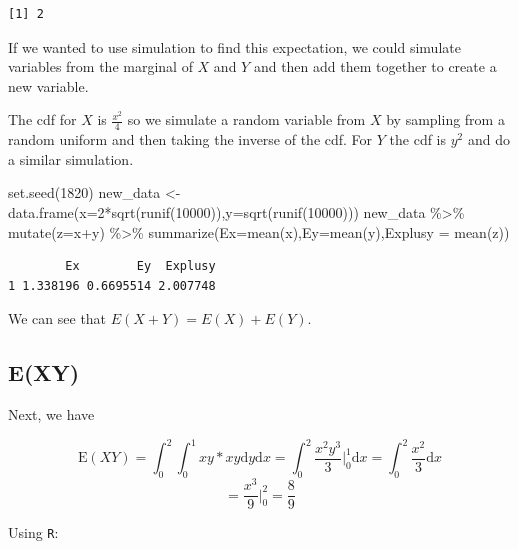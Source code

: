 \documentclass[
  letterpaper,
  DIV=11,
  numbers=noendperiod]{scrreprt}
\newenvironment{Shaded}{\begin{snugshade}}{\end{snugshade}}
\newcommand{\AttributeTok}[1]{\textcolor[rgb]{0.40,0.45,0.13}{#1}}
\newcommand{\DecValTok}[1]{\textcolor[rgb]{0.68,0.00,0.00}{#1}}
\newcommand{\FunctionTok}[1]{\textcolor[rgb]{0.28,0.35,0.67}{#1}}
\newcommand{\NormalTok}[1]{\textcolor[rgb]{0.00,0.23,0.31}{#1}}
\newcommand{\OtherTok}[1]{\textcolor[rgb]{0.00,0.23,0.31}{#1}}
\newcommand{\SpecialCharTok}[1]{\textcolor[rgb]{0.37,0.37,0.37}{#1}}
\begin{document}
\begin{verbatim}
[1] 2
\end{verbatim}

If we wanted to use simulation to find this expectation, we could
simulate variables from the marginal of \(X\) and \(Y\) and then add
them together to create a new variable.

The cdf for \(X\) is \(\frac{x^2}{4}\) so we simulate a random variable
from \(X\) by sampling from a random uniform and then taking the inverse
of the cdf. For \(Y\) the cdf is \(y^2\) and do a similar simulation.

\begin{Shaded}
\begin{Highlighting}[]
\FunctionTok{set.seed}\NormalTok{(}\DecValTok{1820}\NormalTok{)}
\NormalTok{new\_data }\OtherTok{\textless{}{-}} \FunctionTok{data.frame}\NormalTok{(}\AttributeTok{x=}\DecValTok{2}\SpecialCharTok{*}\FunctionTok{sqrt}\NormalTok{(}\FunctionTok{runif}\NormalTok{(}\DecValTok{10000}\NormalTok{)),}\AttributeTok{y=}\FunctionTok{sqrt}\NormalTok{(}\FunctionTok{runif}\NormalTok{(}\DecValTok{10000}\NormalTok{)))}
\NormalTok{new\_data }\SpecialCharTok{\%\textgreater{}\%}
  \FunctionTok{mutate}\NormalTok{(}\AttributeTok{z=}\NormalTok{x}\SpecialCharTok{+}\NormalTok{y) }\SpecialCharTok{\%\textgreater{}\%}
  \FunctionTok{summarize}\NormalTok{(}\AttributeTok{Ex=}\FunctionTok{mean}\NormalTok{(x),}\AttributeTok{Ey=}\FunctionTok{mean}\NormalTok{(y),}\AttributeTok{Explusy =} \FunctionTok{mean}\NormalTok{(z))}
\end{Highlighting}
\end{Shaded}

\begin{verbatim}
        Ex        Ey  Explusy
1 1.338196 0.6695514 2.007748
\end{verbatim}

We can see that \(E(X + Y) = E(X) + E(Y)\).

\subsection{E(XY)}\label{exy-3}

Next, we have

\[
\mbox{E}(XY)=\int_0^2\int_0^1 xy*xy\mbox{d} y \mbox{d} x = \int_0^2 \frac{x^2y^3}{3}\bigg|_0^1 \mbox{d} x = \int_0^2 \frac{x^2}{3}\mbox{d} x
\] \[
=\frac{x^3}{9}\bigg|_0^2 = \frac{8}{9}
\]

Using \texttt{R}:
\end{document}
